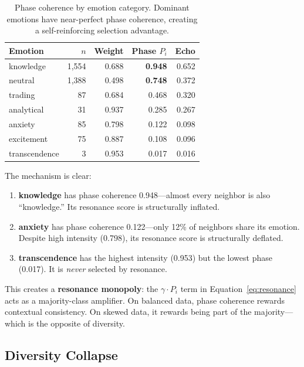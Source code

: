 \documentclass[11pt,a4paper]{article}
\begin{document}
\begin{table}[h]
\centering
\caption{Phase coherence by emotion category. Dominant emotions have near-perfect phase coherence, creating a self-reinforcing selection advantage.}
\label{tab:phase}
\small
\begin{tabular}{@{}lrrrr@{}}
\toprule
\textbf{Emotion} & \textbf{$n$} & \textbf{Weight} & \textbf{Phase $P_i$} & \textbf{Echo} \\
\midrule
knowledge     & 1,554 & 0.688 & \textbf{0.948} & 0.652 \\
neutral       & 1,388 & 0.498 & \textbf{0.748} & 0.372 \\
trading       & 87    & 0.684 & 0.468 & 0.320 \\
analytical    & 31    & 0.937 & 0.285 & 0.267 \\
anxiety       & 85    & 0.798 & 0.122 & 0.098 \\
excitement    & 75    & 0.887 & 0.108 & 0.096 \\
transcendence & 3     & 0.953 & 0.017 & 0.016 \\
\bottomrule
\end{tabular}
\end{table}

The mechanism is clear:
\begin{enumerate}[itemsep=2pt]
  \item \textbf{knowledge} has phase coherence 0.948---almost every neighbor is also ``knowledge.'' Its resonance score is structurally inflated.
  \item \textbf{anxiety} has phase coherence 0.122---only 12\% of neighbors share its emotion. Despite high intensity (0.798), its resonance score is structurally deflated.
  \item \textbf{transcendence} has the highest intensity (0.953) but the lowest phase (0.017). It is \emph{never} selected by resonance.
\end{enumerate}

This creates a \textbf{resonance monopoly}: the $\gamma \cdot P_i$ term in Equation~\ref{eq:resonance} acts as a majority-class amplifier. On balanced data, phase coherence rewards contextual consistency. On skewed data, it rewards being part of the majority---which is the opposite of diversity.

\subsection{Diversity Collapse}
\end{document}
